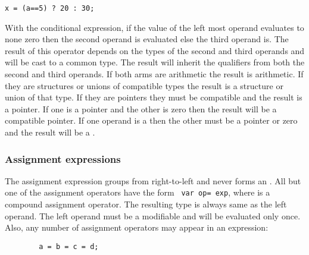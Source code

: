 \begin{production}
\begin{verbatim}
x = (a==5) ? 20 : 30;
\end{verbatim}
\end{production}

With the conditional expression, if the value of the left most operand
evaluates to none zero then the second operand is evaluated else the
third operand is. The result of this 
 operator depends
on the types of the second and third operands and will be cast to a
common type. The result will inherit the qualifiers from both the second and
third operands. If both arms are arithmetic the result is arithmetic.
If they are structures or unions of compatible types the result is a
structure or union of that type. If they are pointers they must be
compatible and the result is a pointer. If one is a pointer and the
other is zero then the result will be a compatible pointer. If one operand
is a  then the other must be a pointer or zero and the result
will be a .

\subsubsection{Assignment expressions}
\label{sec:AssignmentExpression}

\begin{production}
\end{production}


The assignment expression groups from right-to-left and never forms an
. All but one of the assignment operators have the form
\verb+ var op= exp+, where  is a compound assignment operator.
The resulting type is always same as the left operand.  The left
operand must be a modifiable  and will be evaluated only
once. Also, any number of assignment operators may appear in an
expression:

\begin{production}
\begin{verbatim}
        a = b = c = d; 
\end{verbatim}
\end{production}


